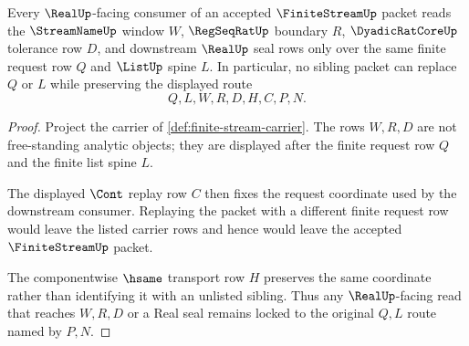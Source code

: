 \begin{theorem}
\label{thm:finite-stream-section-sibling-lock}
Every $\RealUp$-facing consumer of an accepted $\FiniteStreamUp$ packet reads the $\StreamNameUp$ window $W$, $\RegSeqRatUp$ boundary $R$, $\DyadicRatCoreUp$ tolerance row $D$, and downstream $\RealUp$ seal rows only over the same finite request row $Q$ and $\ListUp$ spine $L$. In particular, no sibling packet can replace $Q$ or $L$ while preserving the displayed route
$$
Q,L,W,R,D,H,C,P,N.
$$
\end{theorem}
\begin{proof}
Project the carrier of \autoref{def:finite-stream-carrier}. The rows $W,R,D$ are not free-standing analytic objects; they are displayed after the finite request row $Q$ and the finite list spine $L$.

The displayed $\Cont$ replay row $C$ then fixes the request coordinate used by the downstream consumer. Replaying the packet with a different finite request row would leave the listed carrier rows and hence would leave the accepted $\FiniteStreamUp$ packet.

The componentwise $\hsame$ transport row $H$ preserves the same coordinate rather than identifying it with an unlisted sibling. Thus any $\RealUp$-facing read that reaches $W,R,D$ or a Real seal remains locked to the original $Q,L$ route named by $P,N$.
\end{proof}

